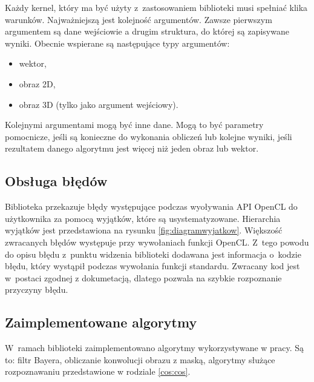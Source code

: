 Każdy kernel, który ma być użyty z~zastosowaniem biblioteki musi spełniać klika warunków. Najważniejszą jest kolejność argumentów. Zawsze pierwszym argumentem są dane wejściowie a drugim struktura, do której są zapisywane wyniki. Obecnie wspierane są następujące typy argumentów:
\begin{itemize}
\item wektor,
\item obraz 2D,
\item obraz 3D (tylko jako argument wejściowy).
\end{itemize}
Kolejnymi argumentami mogą być inne dane. Mogą to być parametry pomocnicze, jeśli są konieczne do wykonania obliczeń lub kolejne wyniki, jeśli rezultatem danego algorytmu jest więcej niż jeden obraz lub wektor.

\subsection{Obsługa błędów}
\label{subsec:obslugabledow}

Biblioteka przekazuje błędy występujące podczas wyoływania API OpenCL do użytkownika za pomocą wyjątków, które są usystematyzowane. Hierarchia wyjątków jest przedstawiona na rysunku \ref{fig:diagramwyjatkow}. Większość zwracanych błędów występuje przy wywołaniach funkcji OpenCL. Z~tego powodu do opisu błędu z~punktu widzenia biblioteki dodawana jest informacja o~kodzie błędu, który wystąpił podczas wywołania funkcji standardu. Zwracany kod jest w~postaci zgodnej z dokumetacją, dlatego pozwala na szybkie rozpoznanie przyczyny błędu.

\subsection{Zaimplementowane algorytmy}
\label{subsec:algorytmy}

W~ramach biblioteki zaimplementowano algorytmy wykorzystywane w pracy. Są to: filtr Bayera, obliczanie konwolucji obrazu z maską, algorytmy służące rozpoznawaniu przedstawione w rodziale \ref{cos:cos}.